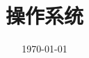 \documentclass[a4paper,12pt]{article}
\begin{document}
    \title{操作系统}
    \date{\today}
    \maketitle
    \renewcommand{\contentsname}{}
    \tableofcontents
    \newpage

    

    

    

    

    
\end{document}
